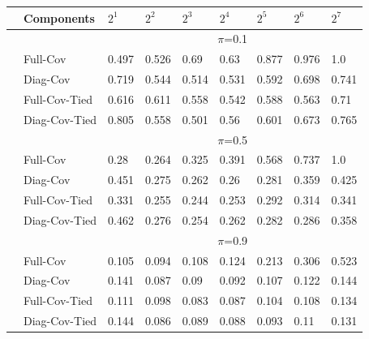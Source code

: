 \documentclass[english]{report}
\begin{document}
\begin{table}[H]
    \centering
    \begin{tabular}{ll|lllllll}
        \hline
                                & \textbf{Components} & $2^1$ & $2^2$ & $2^3$ & $2^4$ & $2^5$ & $2^6$ & $2^7$ \\ \hline
                                & & \multicolumn{7}{c}{$\pi$=0.1} \\ \hline
                                & Full-Cov        & 0.497 & 0.526 & 0.69 & 0.63 & 0.877 & 0.976 & 1.0   \\
                                & Diag-Cov        & 0.719 & 0.544 & 0.514 & 0.531 & 0.592 & 0.698 & 0.741  \\
                                & Full-Cov-Tied   & 0.616 & 0.611 & 0.558 & 0.542 & 0.588 & 0.563 & 0.71  \\ 
                                & Diag-Cov-Tied   & 0.805 & 0.558 & 0.501 & 0.56 & 0.601 & 0.673 & 0.765  \\ \hline

                                & & \multicolumn{7}{c}{$\pi$=0.5} \\ \hline
                                & Full-Cov          & 0.28 & 0.264 & 0.325 & 0.391 & 0.568 & 0.737 & 1.0     \\
                                & Diag-Cov          & 0.451 & 0.275 & 0.262 & 0.26 & 0.281 & 0.359 & 0.425  \\
                                & Full-Cov-Tied     & 0.331 & 0.255 & 0.244 & 0.253 & 0.292 & 0.314 & 0.341  \\ 
                                & Diag-Cov-Tied     & 0.462 & 0.276 & 0.254 & 0.262 & 0.282 & 0.286 &  0.358 \\ \hline

                                & & \multicolumn{7}{c}{$\pi$=0.9} \\ \hline
                                & Full-Cov          & 0.105 & 0.094 & 0.108 & 0.124 & 0.213 & 0.306 & 0.523    \\
                                & Diag-Cov          & 0.141 & 0.087 & 0.09 & 0.092 & 0.107 & 0.122 & 0.144  \\
                                & Full-Cov-Tied     & 0.111 & 0.098 & 0.083 & 0.087 & 0.104 & 0.108 & 0.134  \\ 
                                & Diag-Cov-Tied     & 0.144 & 0.086 & 0.089 & 0.088 & 0.093 & 0.11 & 0.131  \\ \hline 
    \hline
    \end{tabular}
    \label{tab:GMM_valid}
\end{table}
\end{document}
